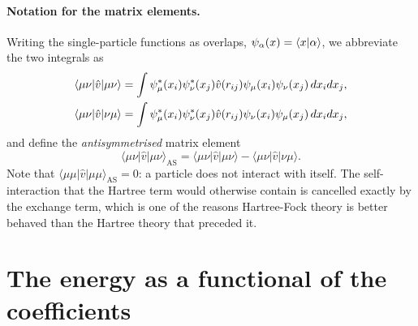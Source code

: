\paragraph{Notation for the matrix elements.}
Writing the single-particle functions as overlaps,
$\psi_{\alpha}(x)=\langle x \vert \alpha \rangle$, we abbreviate the two integrals as
\begin{align}
  \langle\mu\nu|\hat{v}|\mu\nu\rangle
   &= \int \psi_{\mu}^{*}(x_i)\psi_{\nu}^{*}(x_j)\hat{v}(r_{ij})
      \psi_{\mu}(x_i)\psi_{\nu}(x_j)\,dx_idx_j,
  \label{eq:2-direct}\\
  \langle\mu\nu|\hat{v}|\nu\mu\rangle
   &= \int \psi_{\mu}^{*}(x_i)\psi_{\nu}^{*}(x_j)\hat{v}(r_{ij})
      \psi_{\nu}(x_i)\psi_{\mu}(x_j)\,dx_idx_j,
  \label{eq:2-exchange}
\end{align}
and define the \emph{antisymmetrised} matrix element
\begin{equation}
  \langle\mu\nu|\hat{v}|\mu\nu\rangle_{\mathrm{AS}}
   = \langle\mu\nu|\hat{v}|\mu\nu\rangle
   - \langle\mu\nu|\hat{v}|\nu\mu\rangle .
  \label{eq:2-antisymmatrix}
\end{equation}
Note that $\langle\mu\mu|\hat{v}|\mu\mu\rangle_{\mathrm{AS}}=0$: a particle
does not interact with itself.  The self-interaction that the Hartree term
would otherwise contain is cancelled exactly by the exchange term, which is
one of the reasons Hartree-Fock theory is better behaved than the Hartree
theory that preceded it.

\section{The energy as a functional of the coefficients}
\label{sec:energyfunctional}

